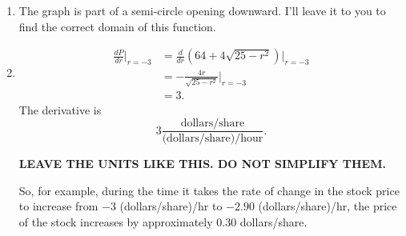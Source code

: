 \documentclass{ximera}
\begin{document}
\begin{question}
\begin{explanation}
\begin{enumerate}
And the stock price at this time is
\[
    P = f(t_0) = 64 + 4\sqrt{25-r^2}.
\]
and our function is
\[
   P = g(r) = 64 + 4\sqrt{25-r^2}.
\]

\item The graph is part of a semi-circle opening downward. I'll leave it to you to find the correct domain of this function.

\item 
\begin{align*}
  \frac{dP}{dr}\Big|_{r=-3} &=  \frac{d}{dr}\left( 64 + 4\sqrt{25-r^2} \right) \Big|_{r=-3} \\
                                        &=- \frac{4r}{\sqrt{25 - r^2}}\Big|_{r=-3} \\
                                        &= 3.
\end{align*} 
The derivative is 
\[
   3 \frac{\text{dollars/share}}{\text{(dollars/share)/hour}} .
\]

{\bf LEAVE THE UNITS LIKE THIS. DO NOT SIMPLIFY THEM.}

So, for example, during the time it takes the rate of change in the stock price to increase from $-3$ (dollars/share)/hr to $-2.90$ (dollars/share)/hr, the price of the stock increases by approximately $0.30$ dollars/share.  


\end{enumerate}
\end{explanation}

\end{question}
\end{document}

